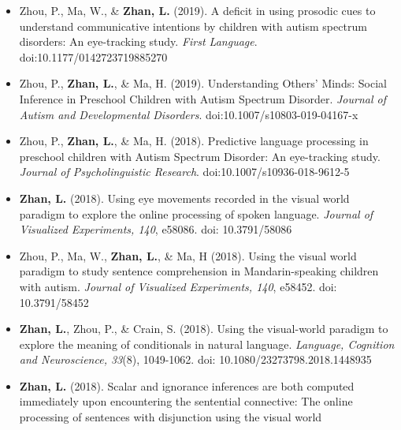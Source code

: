 \documentclass[12pt,]{article}
\begin{document}
\begin{itemize}
\item
  Zhou, P., Ma, W., \& \textbf{Zhan, L.} (2019). A deficit in using
  prosodic cues to understand communicative intentions by children with
  autism spectrum disorders: An eye-tracking study. \emph{First
  Language}. doi:10.1177/0142723719885270
  \href{https://publications.likan.info/Periodicals/FirstLang2019.pdf}{
  \faFilePdf[regular] }
\item
  Zhou, P., \textbf{Zhan, L.}, \& Ma, H. (2019). Understanding Others'
  Minds: Social Inference in Preschool Children with Autism Spectrum
  Disorder. \emph{Journal of Autism and Developmental Disorders}.
  doi:10.1007/s10803-019-04167-x
  \href{https://publications.likan.info/Periodicals/JAutismDevDisord2019.pdf}{
  \faFilePdf[regular] }
\item
  Zhou, P., \textbf{Zhan, L.}, \& Ma, H. (2018). Predictive language
  processing in preschool children with Autism Spectrum Disorder: An
  eye-tracking study. \emph{Journal of Psycholinguistic Research}.
  doi:10.1007/s10936-018-9612-5
  \href{https://publications.likan.info/Periodicals/JPsycholinguistRes2018.pdf}{
  \faFilePdf[regular] }
\item
  \textbf{Zhan, L.} (2018). Using eye movements recorded in the visual
  world paradigm to explore the online processing of spoken language.
  \emph{Journal of Visualized Experiments, 140}, e58086. doi:
  10.3791/58086
  \href{https://publications.likan.info/Periodicals/jove-protocol-58086.pdf}{
  \faFilePdf[regular] }
\item
  Zhou, P., Ma, W., \textbf{Zhan, L.}, \& Ma, H (2018). Using the visual
  world paradigm to study sentence comprehension in Mandarin-speaking
  children with autism. \emph{Journal of Visualized Experiments, 140},
  e58452. doi: 10.3791/58452
  \href{https://publications.likan.info/Periodicals/jove-protocol-58452.pdf}{
  \faFilePdf[regular] }
\item
  \textbf{Zhan, L.}, Zhou, P., \& Crain, S. (2018). Using the
  visual-world paradigm to explore the meaning of conditionals in
  natural language. \emph{Language, Cognition and Neuroscience, 33}(8),
  1049-1062. doi: 10.1080/23273798.2018.1448935
  \href{https://publications.likan.info/Periodicals/LangCognNeurosci2018.pdf}{
  \faFilePdf[regular] }
\item
  \textbf{Zhan, L.} (2018). Scalar and ignorance inferences are both
  computed immediately upon encountering the sentential connective: The
  online processing of sentences with disjunction using the visual world

\end{itemize}
\end{document}
